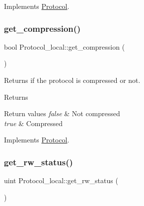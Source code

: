 Implements \mbox{\hyperlink{classProtocol_a636debc9b25f4e60864902cdd1b3e87a}{Protocol}}.

\mbox{\label{classProtocol__local_a968e04275fa9c80a11f0ca5ac7613d31}} 
\subsubsection{\texorpdfstring{get\+\_\+compression()}{get\_compression()}}
{\footnotesize\ttfamily bool Protocol\+\_\+local\+::get\+\_\+compression (\begin{DoxyParamCaption}{ }\end{DoxyParamCaption})\hspace{0.3cm}{\ttfamily [virtual]}}

Returns if the protocol is compressed or not.

\begin{DoxyReturn}{Returns}

\end{DoxyReturn}

\begin{DoxyRetVals}{Return values}
{\em false} & Not compressed \\
\hline
{\em true} & Compressed \\
\hline
\end{DoxyRetVals}


Implements \mbox{\hyperlink{classProtocol_a7b500a3f2e52a98903d853b8f365ac7d}{Protocol}}.

\mbox{\label{classProtocol__local_a6699b46f137f58d32c7a0f934a221376}} 
\subsubsection{\texorpdfstring{get\+\_\+rw\+\_\+status()}{get\_rw\_status()}}
{\footnotesize\ttfamily uint Protocol\+\_\+local\+::get\+\_\+rw\+\_\+status (\begin{DoxyParamCaption}{ }\end{DoxyParamCaption})\hspace{0.3cm}{\ttfamily [virtual]}}

